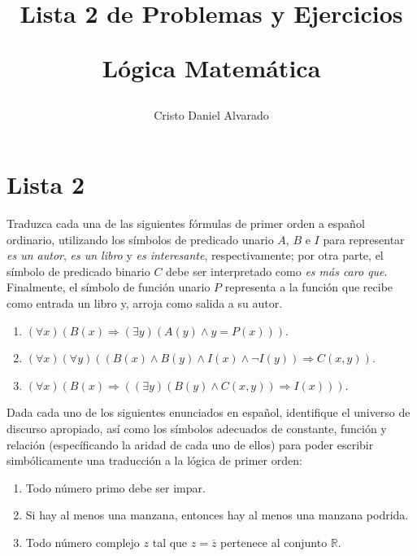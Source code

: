 \documentclass[12pt]{report}
\theoremstyle{largebreak}
\begin{document}
    \setlength{\parskip}{5pt} %
    \setlength{\parindent}{12pt} %
    \title{Lista 2 de Problemas y Ejercicios
    
    Lógica Matemática}
    \author{Cristo Daniel Alvarado}
    \maketitle

    
    \setcounter{chapter}{1}

    \chapter{Lista 2}
    
    \setcounter{section}{1}

    \begin{excer}
        Traduzca cada una de las siguientes fórmulas de primer orden a español ordinario, utilizando los símbolos de predicado unario $A$, $B$ e $I$ para representar \textit{es un autor}, \textit{es un libro} y \textit{es interesante}, respectivamente; por otra parte, el símbolo de predicado binario $C$ debe ser interpretado como \textit{es más caro que}. Finalmente, el símbolo de función unario $P$ representa a la función que recibe como entrada un libro y, arroja como salida a su autor.
        \begin{enumerate}[label=($\alph*$)]
            \item $(\forall x)(B(x)\Rightarrow (\exists y)(A(y)\land y=P(x)))$.
            \item $(\forall x)(\forall y)((B(x)\land B(y)\land I(x)\land\neg I(y))\Rightarrow C(x,y))$.
            \item $(\forall x)(B(x)\Rightarrow((\exists y)(B(y)\land C(x,y))\Rightarrow I(x)))$.
        \end{enumerate}
    \end{excer}

    \begin{sol}
    \end{sol}

    \begin{excer}
        Dada cada uno de los siguientes enunciados en español, identifique el universo de discurso apropiado, así como los símbolos adecuados de constante, función y relación (específicando la aridad de cada uno de ellos) para poder escribir simbólicamente una traducción a la lógica de primer orden:
        \begin{enumerate}[label=($\alph*$)]
            \item Todo número primo debe ser impar.
            \item Si hay al menos una manzana, entonces hay al menos una manzana podrida.
            \item Todo número complejo $z$ tal que $z=\overline{z}$ pertenece al conjunto $\mathbb{R}$.
        \end{enumerate}
    \end{excer}
\end{document}
